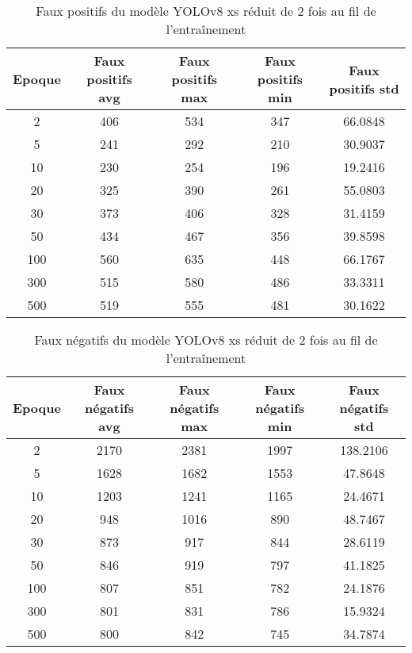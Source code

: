 \begin{table}[!ht]
    \caption{Faux positifs du modèle YOLOv8 xs réduit de 2 fois au fil de l'entraînement}
    \label{tab:yolov8xs_reduced2x_false_positive}
    \centering
    \begin{tabular}{ |c||c|c|c|c|  }
        \hline
        \rowcolor{gray!50}
        Epoque & Faux positifs avg & Faux positifs max & Faux positifs min & Faux positifs std\\
        \hline
        2 & 406 & 534 & 347 & 66.0848\\
        5 & 241 & 292 & 210 & 30.9037\\
        10 & 230 & 254 & 196 & 19.2416\\
        20 & 325 & 390 & 261 & 55.0803\\
        30 & 373 & 406 & 328 & 31.4159\\
        50 & 434 & 467 & 356 & 39.8598\\
        100 & 560 & 635 & 448 & 66.1767\\
        300 & 515 & 580 & 486 & 33.3311\\
        500 & 519 & 555 & 481 & 30.1622\\
        \hline
    \end{tabular}
\end{table}

\begin{table}[!ht]
    \caption{Faux négatifs du modèle YOLOv8 xs réduit de 2 fois au fil de l'entraînement}
    \label{tab:yolov8xs_reduced2x_false_negative}
    \centering
    \begin{tabular}{ |c||c|c|c|c|  }
        \hline
        \rowcolor{gray!50}
        Epoque & Faux négatifs avg & Faux négatifs max & Faux négatifs min & Faux négatifs std\\
        \hline
        2 & 2170 & 2381 & 1997 & 138.2106\\
        5 & 1628 & 1682 & 1553 & 47.8648\\
        10 & 1203 & 1241 & 1165 & 24.4671\\
        20 & 948 & 1016 & 890 & 48.7467\\
        30 & 873 & 917 & 844 & 28.6119\\
        50 & 846 & 919 & 797 & 41.1825\\
        100 & 807 & 851 & 782 & 24.1876\\
        300 & 801 & 831 & 786 & 15.9324\\
        500 & 800 & 842 & 745 & 34.7874\\
        \hline
    \end{tabular}
\end{table}

